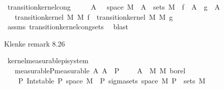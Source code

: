 \begin{isabellebody}
\isamarkupfalse%
%
\endisatagproof
{\isafoldproof}%
%
\isadelimproof
\isanewline
%
\endisadelimproof
\isanewline
{}\isamarkupfalse%
\ transition{\isacharunderscore}{\kern0pt}kernel{\isacharunderscore}{\kern0pt}cong{\isacharcolon}{\kern0pt}\ \isanewline
\ \ \ {\isachardoublequoteopen}{\isasymAnd}{\isasymomega}\ A{\isacharprime}{\kern0pt}{\isachardot}{\kern0pt}\ {\isasymomega}\ {\isasymin}\ space\ M\ {\isasymLongrightarrow}\ A{\isacharprime}{\kern0pt}\ {\isasymin}\ sets\ M{\isacharprime}{\kern0pt}\ {\isasymLongrightarrow}\ f\ {\isasymomega}\ A{\isacharprime}{\kern0pt}\ {\isacharequal}{\kern0pt}\ g\ {\isasymomega}\ A{\isacharprime}{\kern0pt}{\isachardoublequoteclose}\isanewline
\ \ \ {\isachardoublequoteopen}transition{\isacharunderscore}{\kern0pt}kernel\ M\ M{\isacharprime}{\kern0pt}\ f\ {\isacharequal}{\kern0pt}\ transition{\isacharunderscore}{\kern0pt}kernel\ M\ M{\isacharprime}{\kern0pt}\ g{\isachardoublequoteclose}\isanewline
%
\isadelimproof
\ \ %
\endisadelimproof
%
\isatagproof
{}\isamarkupfalse%
\ assms\ transition{\isacharunderscore}{\kern0pt}kernel{\isacharunderscore}{\kern0pt}cong{\isacharunderscore}{\kern0pt}sets\ \isamarkupfalse%
\ blast%
\endisatagproof
{\isafoldproof}%
%
\isadelimproof
%
\endisadelimproof
%
\begin{isamarkuptext}%
Klenke remark 8.26%
\end{isamarkuptext}\isamarkuptrue%
\isamarkupfalse%
\ kernel{\isacharunderscore}{\kern0pt}measurable{\isacharunderscore}{\kern0pt}pi{\isacharunderscore}{\kern0pt}system{\isacharcolon}{\kern0pt}\isanewline
\ \ \ measurable{\isacharunderscore}{\kern0pt}P{\isacharbrackleft}{\kern0pt}measurable{\isacharbrackright}{\kern0pt}{\isacharcolon}{\kern0pt}\ {\isachardoublequoteopen}{\isasymAnd}A{\isacharprime}{\kern0pt}{\isachardot}{\kern0pt}\ A{\isacharprime}{\kern0pt}\ {\isasymin}\ P\ {\isasymLongrightarrow}\ {\isacharparenleft}{\kern0pt}{\isasymlambda}{\isasymomega}{\isachardot}{\kern0pt}\ {\isasymkappa}\ {\isasymomega}\ A{\isacharprime}{\kern0pt}{\isacharparenright}{\kern0pt}\ {\isasymin}\ M\ {\isasymrightarrow}\isactrlsub M\ borel{\isachardoublequoteclose}\ \isanewline
\ \ \ \ P{\isacharcolon}{\kern0pt}\ {\isachardoublequoteopen}Int{\isacharunderscore}{\kern0pt}stable\ P{\isachardoublequoteclose}\ {\isachardoublequoteopen}space\ M{\isacharprime}{\kern0pt}\ {\isasymin}\ P{\isachardoublequoteclose}\ {\isachardoublequoteopen}sigma{\isacharunderscore}{\kern0pt}sets\ {\isacharparenleft}{\kern0pt}space\ M{\isacharprime}{\kern0pt}{\isacharparenright}{\kern0pt}\ P\ {\isacharequal}{\kern0pt}\ sets\ M{\isacharprime}{\kern0pt}{\isachardoublequoteclose}\ \isanewline

\end{isabellebody}
